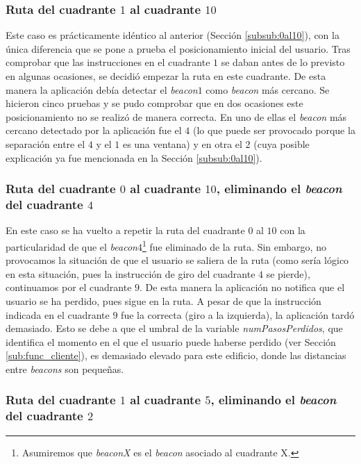 \subsubsection{Ruta del cuadrante $1$ al cuadrante $10$}

Este caso es prácticamente idéntico al anterior (Sección \ref{subsub:0al10}), con la única diferencia que se pone a prueba el posicionamiento inicial del usuario. Tras comprobar que las instrucciones en el cuadrante $1$ se daban antes de lo previsto en algunas ocasiones, se decidió empezar la ruta en este cuadrante. De esta manera la aplicación debía detectar el \textit{beacon$1$} como \textit{beacon} más cercano. Se hicieron cinco pruebas y se pudo comprobar que en dos ocasiones este posicionamiento no se realizó de manera correcta. En uno de ellas el \textit{beacon} más cercano detectado por la aplicación fue el $4$ (lo que puede ser provocado porque la separación entre el $4$ y el $1$ es una ventana) y en otra el $2$ (cuya posible explicación  ya fue mencionada en la Sección \ref{subsub:0al10}).

\subsubsection{Ruta del cuadrante $0$ al cuadrante $10$, eliminando el \textit{beacon} del cuadrante $4$}
\label{subsub:0al10sin4}

En este caso se ha vuelto a repetir la ruta del cuadrante $0$ al $10$ con la particularidad de que el \textit{beacon$4$}\footnote{Asumiremos que \textit{beaconX} es el \textit{beacon} asociado al cuadrante X.} fue eliminado de la ruta. Sin embargo, no provocamos la situación de que el usuario se saliera de la ruta (como sería lógico en esta situación, pues la instrucción de giro del cuadrante $4$ se pierde), continuamos por el cuadrante $9$. De esta manera la aplicación no notifica que el usuario se ha perdido, pues sigue en la ruta. A pesar de que la instrucción indicada en el cuadrante $9$ fue la correcta (giro a la izquierda), la aplicación tardó demasiado. Esto se debe a que el umbral de la variable \textit{numPasosPerdidos}, que identifica el momento en el que el usuario puede haberse perdido (ver Sección \ref{sub:func_cliente}), es demasiado elevado para este edificio, donde las distancias entre \textit{beacons} son pequeñas.


\subsubsection{Ruta del cuadrante $1$ al cuadrante $5$, eliminando el \textit{beacon} del cuadrante $2$}
\label{subsub:1al5sin2}

